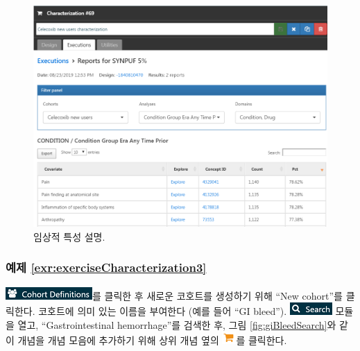 \documentclass[10.5pt]{book}
\theoremstyle{definition}
\theoremstyle{definition}
\theoremstyle{definition}
\theoremstyle{remark}
\begin{document}
\begin{figure}

{\centering \includegraphics[width=1\linewidth]{images/SuggestedAnswers/celecoxibCharacterizationResults} 

}

\caption{임상적 특성 설명.}\label{fig:celecoxibCharacterizationResults}
\end{figure}

\subsubsection*{예제
\ref{exr:exerciseCharacterization3}}\label{-refexrexercisecharacterization3}

\includegraphics{images/Cohorts/cohortdefinition.png}를 클릭한 후 새로운
코호트를 생성하기 위해 ``New cohort''를 클릭한다. 코호트에 의미 있는
이름을 부여한다 (예를 들어 ``GI bleed'').
\includegraphics{images/Cohorts/search-2.png} 모듈을 열고,
``Gastrointestinal hemorrhage''를 검색한 후, 그림
\ref{fig:giBleedSearch}와 같이 개념을 개념 모음에 추가하기 위해 상위
개념 옆의 \includegraphics{images/Cohorts/shoppingcart.png}를 클릭한다.
\end{document}

